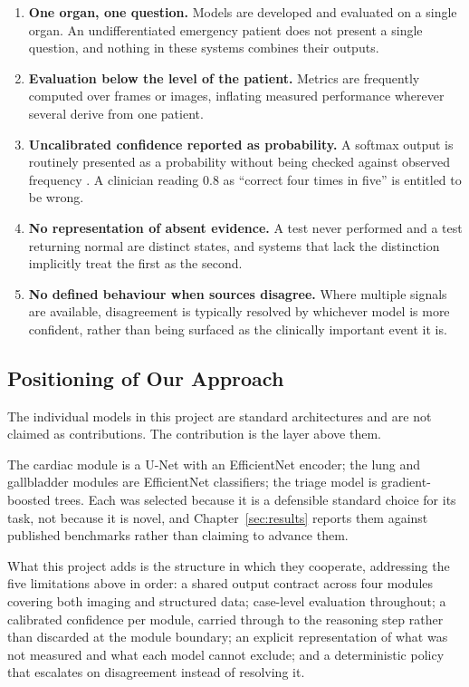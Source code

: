 \begin{enumerate}
  \setlength\itemsep{0.25em}
  \item \textbf{One organ, one question.} Models are developed and evaluated on a single
    organ. An undifferentiated emergency patient does not present a single question, and
    nothing in these systems combines their outputs.
  \item \textbf{Evaluation below the level of the patient.} Metrics are frequently computed
    over frames or images, inflating measured performance wherever several derive from one
    patient.
  \item \textbf{Uncalibrated confidence reported as probability.} A softmax output is
    routinely presented as a probability without being checked against observed frequency
    \cite{guo2017calibration}. A clinician reading 0.8 as ``correct four times in five''
    is entitled to be wrong.
  \item \textbf{No representation of absent evidence.} A test never performed and a test
    returning normal are distinct states, and systems that lack the distinction implicitly
    treat the first as the second.
  \item \textbf{No defined behaviour when sources disagree.} Where multiple signals are
    available, disagreement is typically resolved by whichever model is more confident,
    rather than being surfaced as the clinically important event it is.
\end{enumerate}

\subsection{Positioning of Our Approach}
\label{subsec:sota-positioning}

\begin{keystatement}
The individual models in this project are standard architectures and are not claimed as
contributions. The contribution is the layer above them.
\end{keystatement}

The cardiac module is a U-Net with an EfficientNet encoder; the lung and gallbladder
modules are EfficientNet classifiers; the triage model is gradient-boosted trees. Each was
selected because it is a defensible standard choice for its task, not because it is novel,
and Chapter~\ref{sec:results} reports them against published benchmarks rather than
claiming to advance them.

What this project adds is the structure in which they cooperate, addressing the five
limitations above in order: a shared output contract across four modules covering both
imaging and structured data; case-level evaluation throughout; a calibrated confidence per
module, carried through to the reasoning step rather than discarded at the module boundary;
an explicit representation of what was not measured and what each model cannot exclude; and
a deterministic policy that escalates on disagreement instead of resolving it.


